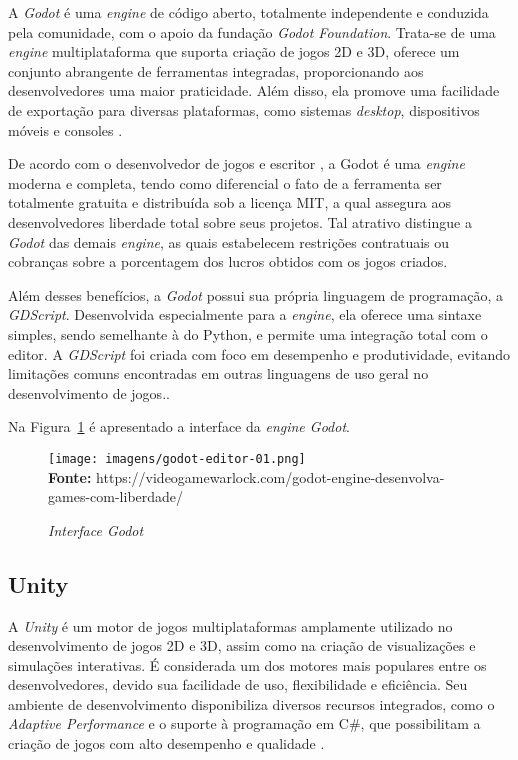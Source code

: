 A \textit{Godot} é uma \textit{engine} de código aberto, totalmente independente e conduzida pela comunidade, com o apoio da fundação \textit{Godot Foundation}. Trata-se de uma \textit{engine} multiplataforma que suporta criação de jogos 2D e 3D, oferece um conjunto abrangente de ferramentas integradas, proporcionando aos desenvolvedores uma maior praticidade. Além disso, ela promove uma facilidade de exportação para diversas plataformas, como sistemas \textit{desktop}, dispositivos móveis e consoles  \cite{GodotDocs2024}.

De acordo com o desenvolvedor de jogos e escritor , a Godot é uma \textit{engine} moderna e completa, tendo como diferencial o fato de a ferramenta ser totalmente gratuita e distribuída sob a licença MIT, a qual assegura aos desenvolvedores liberdade total sobre seus projetos. Tal atrativo distingue a \textit{Godot} das demais \textit{engine}, as quais estabelecem restrições contratuais ou cobranças sobre a porcentagem dos lucros obtidos com os jogos criados.


Além desses benefícios, a \textit{Godot} possui sua própria linguagem de programação, a  \textit{GDScript}. Desenvolvida especialmente para a \textit{engine}, ela oferece uma sintaxe simples, sendo semelhante à do Python, e permite uma integração total com o editor. A \textit{GDScript} foi criada com foco em desempenho e produtividade, evitando limitações comuns encontradas em outras linguagens de uso geral no desenvolvimento de jogos.\cite{GodotDocs2024}.

Na Figura~\ref{fig:godot} é apresentado a interface da \textit{engine Godot}.

\FloatBarrier 
\begin{figure}[!htbp]
	\centering
	\caption{\textit{Interface Godot}}
	\texttt{[image: imagens/godot-editor-01.png]}
	\\\textbf{Fonte:} https://videogamewarlock.com/godot-engine-desenvolva-games-com-liberdade/
	
	\label{fig:godot}
\end{figure}
\FloatBarrier


\subsection{Unity}

A \textit{Unity} é um motor de jogos multiplataformas amplamente utilizado no desenvolvimento de jogos 2D e 3D, assim como na criação de visualizações e simulações interativas. É considerada um dos motores mais populares entre os desenvolvedores, devido sua facilidade de uso, flexibilidade e eficiência. Seu ambiente de desenvolvimento disponibiliza diversos recursos integrados, como o \textit{Adaptive Performance} e o suporte à programação em C\#, que possibilitam a criação de jogos com alto desempenho e qualidade \cite{Hussain2020}.

